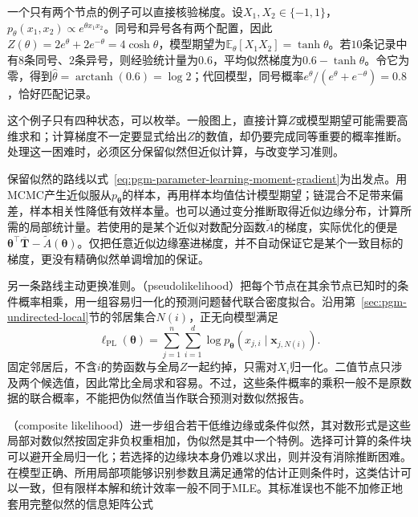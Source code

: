一个只有两个节点的例子可以直接核验梯度。设$X_1,X_2\in\{-1,1\}$，$p_\theta(x_1,x_2)\propto e^{\theta x_1x_2}$。同号和异号各有两个配置，因此$Z(\theta)=2e^\theta+2e^{-\theta}=4\cosh\theta$，模型期望为$\mathbb{E}_\theta[X_1X_2]=\tanh\theta$。若$10$条记录中有$8$条同号、$2$条异号，则经验统计量为$0.6$，平均似然梯度为$0.6-\tanh\theta$。令它为零，得到$\widehat\theta=\operatorname{arctanh}(0.6)=\log2$；代回模型，同号概率$e^\theta/(e^\theta+e^{-\theta})=0.8$，恰好匹配记录。

这个例子只有四种状态，可以枚举。一般图上，直接计算$Z$或模型期望可能需要高维求和；计算梯度不一定要显式给出$Z$的数值，却仍要完成同等重要的概率推断。处理这一困难时，必须区分保留似然但近似计算，与改变学习准则。

保留似然的路线以式~\eqref{eq:pgm-parameter-learning-moment-gradient}为出发点。用MCMC产生近似服从$p_{\bm{\theta}}$的样本，再用样本均值估计模型期望；链混合不足带来偏差，样本相关性降低有效样本量。也可以通过变分推断取得近似边缘分布，计算所需的局部统计量。若使用的是某个近似对数配分函数$\widetilde A$的梯度，实际优化的便是$\bm{\theta}^\top\overline{\bm{T}}-\widetilde A(\bm{\theta})$。仅把任意近似边缘塞进梯度，并不自动保证它是某个一致目标的梯度，更没有精确似然单调增加的保证。

另一条路线主动更换准则。（pseudolikelihood）把每个节点在其余节点已知时的条件概率相乘，用一组容易归一化的预测问题替代联合密度拟合。沿用第~\ref{sec:pgm-undirected-local}节的邻居集合$N(i)$，正无向模型满足
\begin{equation}
  \ell_{\mathrm{PL}}(\bm{\theta})
  =\sum_{j=1}^n\sum_{i=1}^d
    \log p_{\bm{\theta}}
      (x_{j,i}\mid\bm{x}_{j,N(i)}).
  \label{eq:pgm-parameter-learning-pseudolikelihood}
\end{equation}
固定邻居后，不含$i$的势函数与全局$Z$一起约掉，只需对$X_i$归一化。二值节点只涉及两个候选值，因此常比全局求和容易。不过，这些条件概率的乘积一般不是原数据的联合概率，不能把伪似然值当作联合预测对数似然报告。

（composite likelihood）进一步组合若干低维边缘或条件似然，其对数形式是这些局部对数似然按固定非负权重相加，伪似然是其中一个特例。选择可计算的条件块可以避开全局归一化；若选择的边缘块本身仍难以求出，则并没有消除推断困难。在模型正确、所用局部项能够识别参数且满足通常的估计正则条件时，这类估计可以一致，但有限样本解和统计效率一般不同于MLE。其标准误也不能不加修正地套用完整似然的信息矩阵公式

